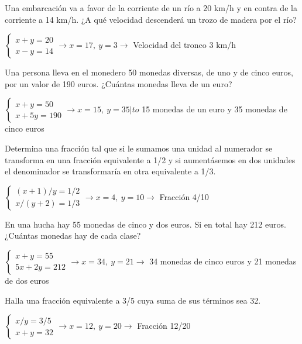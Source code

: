 \documentclass[spanish, 12pt]{exam}
\begin{document}
\begin{questions}
\question Una embarcación va a favor de la corriente de un río a 20 km/h y en contra de la corriente a 14 km/h. ¿A qué velocidad descenderá un trozo de madera por el río?

\begin{solution} $\left\{\begin{matrix}x+y=20 \\ x-y=14\end{matrix}\right. \to  x = 17, \  y = 3 \to$ Velocidad del tronco 3 km/h \end{solution}

\question Una persona lleva en el monedero 50 monedas diversas, de uno y de cinco euros, por un valor de 190 euros. ¿Cuántas monedas lleva de un euro?
\begin{solution} $\left\{\begin{matrix}x+y=50 \\ x+5y=190\end{matrix}\right. \to  x = 15, \  y = 35 |to$ 15 monedas de un euro y 35 monedas de cinco euros \end{solution}

\question Determina una fracción tal que si le sumamos una unidad al numerador se transforma en una fracción equivalente a 1/2 y si aumentásemos en dos unidades el denominador se transformaría en otra equivalente a 1/3.

\begin{solution} $\left\{\begin{matrix}(x+1)/y=1/2 \\ x/(y+2)=1/3\end{matrix}\right. \to  x = 4, \  y = 10 \to$ Fracción 4/10 \end{solution}

\question En una hucha hay 55 monedas de cinco y dos euros. Si en total hay 212 euros. ¿Cuántas monedas hay de cada clase?
\begin{solution} $\left\{\begin{matrix}x+y=55 \\ 5x+2y=212\end{matrix}\right. \to  x = 34, \  y = 21 \to$ 34 monedas de cinco euros y 21 monedas de dos euros \end{solution}

\question Halla una fracción equivalente a 3/5 cuya suma de sus términos sea 32.
\begin{solution} $\left\{\begin{matrix}x/y=3/5 \\ x+y=32\end{matrix}\right. \to  x = 12, \  y = 20 \to$ Fracción 12/20 \end{solution}


\end{questions}
\end{document}
